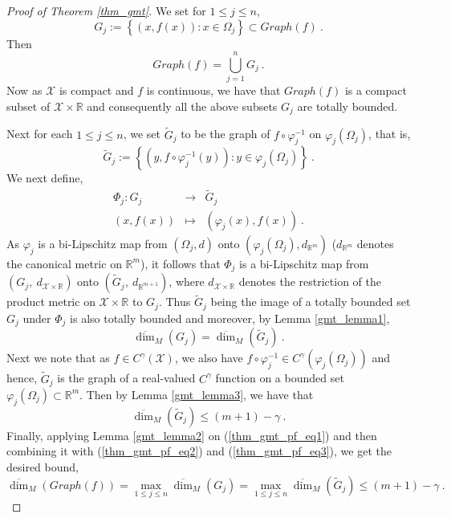 \documentclass[10pt,a4paper]{amsart}
\newcommand{\R}{\mathbb R}%
\begin{document}
\begin{proof}[Proof of Theorem \ref{thm_gmt}]
We set for $1 \le j \le n$,
\begin{equation*}
G_j:= \left\{\left(x,f(x)\right) : x \in \Omega_j\right\} \subset Graph(f)\:.
\end{equation*}
Then
\begin{equation} \label{thm_gmt_pf_eq1}
Graph(f) = \bigcup_{j=1}^n G_j\:.
\end{equation}
Now as $\mathcal{X}$ is compact and $f$ is continuous, we have that $Graph(f)$ is a compact subset of $\mathcal{X} \times \R$ and consequently all the above subsets $G_j$ are totally bounded. 

Next for each $1 \le j \le n$, we set $\tilde{G}_j$ to be the graph of  $f \circ \varphi^{-1}_j$ on $\varphi_j\left(\Omega_j\right)$, that is,
\begin{equation*}
\tilde{G}_j:=\left\{\left(y,f \circ \varphi^{-1}_j(y)\right) : y \in \varphi_j\left(\Omega_j\right)\right\}\:.
\end{equation*}
We next define,
\begin{eqnarray*}
\Phi_j : G_j &\to & \tilde{G}_j \\
\left(x,f(x)\right) &\mapsto & \left(\varphi_j(x),f(x)\right)\:.
\end{eqnarray*}
As $\varphi_j$ is a bi-Lipschitz map from $\left(\Omega_j,d\right)$ onto $\left(\varphi_j\left(\Omega_j\right),d_{\R^m}\right)$ ($d_{\R^m}$ denotes the canonical metric on $\R^m$), it follows that $\Phi_j$ is a bi-Lipschitz map from $\left(G_j,\:d_{\mathcal{X} \times \R}\right)$ onto  $\left(\tilde{G}_j,\:d_{\R^{m+1}}\right)$, where $d_{\mathcal{X} \times \R}$ denotes the restriction of the product metric on $\mathcal{X} \times \R$ to $G_j$. Thus $\tilde{G}_j$ being the image of a totally bounded set $G_j$ under $\Phi_j$ is also totally bounded and moreover, by Lemma \ref{gmt_lemma1},
\begin{equation} \label{thm_gmt_pf_eq2}
\overline{\dim}_M\left(G_j\right)=\overline{\dim}_M\left(\tilde{G}_j\right)\:.
\end{equation}
Next we note that as $f \in C^\gamma(\mathcal{X})$, we also have  $f \circ \varphi^{-1}_j \in C^\gamma(\varphi_j\left(\Omega_j\right))$ and hence, $\tilde{G}_j$ is the graph of a real-valued $C^\gamma$ function on a bounded set $\varphi_j\left(\Omega_j\right) \subset \R^m$. Then by Lemma \ref{gmt_lemma3}, we have that
\begin{equation} \label{thm_gmt_pf_eq3}
\overline{\dim}_M\left(\tilde{G}_j\right) \le (m+1)-\gamma\:.
\end{equation}
Finally, applying Lemma \ref{gmt_lemma2} on (\ref{thm_gmt_pf_eq1}) and then combining it with (\ref{thm_gmt_pf_eq2}) and (\ref{thm_gmt_pf_eq3}), we get the desired bound,
\begin{equation*}
\overline{\dim}_M\left(Graph(f)\right) =\max_{1 \le j \le n}\overline{\dim}_M\left(G_j\right)=\max_{1 \le j \le n}\overline{\dim}_M\left(\tilde{G}_j\right) \le (m+1)-\gamma\:.
\end{equation*}
\end{proof}
\end{document}
